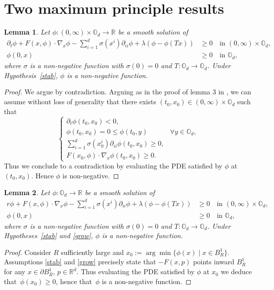 \documentclass[10pt]{amsart}
\newcommand{\argmin}{\arg\min}
\let\sep\mid
\newtheorem{Lemma}{Lemma}[section]
\theoremstyle{definition}
\begin{document}
\section{Two maximum principle results}\label{app:A}
\begin{Lemma}\label{max1}
Let $\phi: (0,\infty)\times \mathbb{O}_d \to \mathbb{R}$ be a smooth solution of
\begin{align*}
\partial_t \phi+F(x,\phi)\cdot\nabla_x \phi-\sum_{i =1}^d \sigma(x^i)\partial_{ii} \phi+\lambda(\phi-\phi(Tx)) &\geq 0 \quad\text{in } (0,\infty)\times \mathbb{O}_d,\\[-3pt]
\phi(0,x)&\geq 0 \quad\text{in } \mathbb{O}_d,
\end{align*}
where $\sigma$ is a non-negative function with $\sigma (0) = 0$ and $T: \mathbb{O}_d \to \mathbb{O}_d$. Under Hypothesis~\ref{stab}, $\phi$ is a non-negative function.
\end{Lemma}
\begin{proof}
We argue by contradiction. Arguing as in the proof of lemma 3 in \cite{bertucci2019some}, we can assume without loss of generality that there exists $(t_0,x_0) \in (0,\infty)\times \mathbb{O}_d$ such that
\begin{equation*}
\begin{cases}
\partial_t \phi (t_0,x_0) < 0,\\
\phi(t_0,x_0) = 0 \leq \phi(t_0,y)& \forall y \in \mathbb{O}_d,\\
\sum_{i =1}^d \sigma(x_0^i)\partial_{ii} \phi(t_0,x_0) \geq 0,\\
F(x_0,\phi)\cdot\nabla_x \phi (t_0,x_0) \geq 0.
\end{cases}
\end{equation*}
Thus we conclude to a contradiction by evaluating the PDE satisfied by $\phi$ at $(t_0,x_0)$. Hence $\phi$ is non-negative.
\end{proof}
\begin{Lemma}\label{max2}
Let $\phi: \mathbb{O}_d \to \mathbb{R}$ be a smooth solution of
\begin{align*}
r \phi+F(x,\phi)\cdot\nabla_x \phi-\sum_{i =1}^d \sigma(x^i)\partial_{ii} \phi+\lambda(\phi-\phi(Tx)) &\geq 0 \quad\text{in } (0,\infty)\times \mathbb{O}_d,\\[-3pt]
\phi(0,x) &\geq 0 \quad\text{in } \mathbb{O}_d,
\end{align*}
where $\sigma$ is a non-negative function with $\sigma (0) = 0$ and $T: \mathbb{O}_d \to \mathbb{O}_d$. Under Hypotheses~\ref{stab} and \ref{grow}, $\phi$ is a non-negative function.
\end{Lemma}
\begin{proof}
Consider $R$ sufficiently large and $x_0:= \argmin\{\phi(x) \sep x \in B^1_R\}$. Assumptions \ref{stab} and \ref{grow} precisely state that $-F(x,p)$ points inward $B^1_R$ for any $x \in \partial B^1_R$, $p \in \mathbb{R}^d$. Thus evaluating the PDE satisfied by $\phi$ at $x_0$ we deduce that~$\phi(x_0) \geq 0$, hence that~$\phi$ is a non-negative function.
\end{proof}
\end{document}
